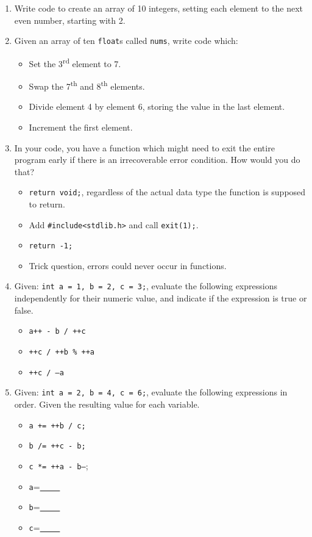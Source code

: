 \documentclass[letter,11pt]{article}
\begin{document}
\begin{enumerate}
    \item Write code to create an array of 10 integers, setting each element to the next even number, starting with 2.
    
    \item Given an array of ten \texttt{float}s called \texttt{nums}, write code which:
    \begin{itemize}
        \item Set the 3\textsuperscript{rd} element to 7.
        \item Swap the 7\textsuperscript{th} and 8\textsuperscript{th} elements.
        \item Divide element 4 by element 6, storing the value in the last element.
        \item Increment the first element.
    \end{itemize}
    
    \item In your code, you have a function which might need to exit the entire program early if there is an irrecoverable error condition. How would you do that?
    \begin{itemize}
        \item \texttt{return void;}, regardless of the actual data type the function is supposed to return.
        \item Add \texttt{\#include<stdlib.h>} and call \texttt{exit(1);}.
        \item \texttt{return -1;}
        \item Trick question, errors could never occur in functions.
    \end{itemize}
    
    \item Given: \texttt{int a = 1, b = 2, c = 3;}, evaluate the following expressions independently for their numeric value, and indicate if the expression is true or false.
    \begin{itemize}
        \item \texttt{a++ - b / ++c}
        \item \texttt{++c / ++b \% ++a}
        \item \texttt{++c / --a}
    \end{itemize}
    
    \item Given: \texttt{int a = 2, b = 4, c = 6;}, evaluate the following expressions in order. Given the resulting value for each variable.
    \begin{itemize}
        \item \texttt{a += ++b / c;}
        \item \texttt{b /= ++c - b;}
        \item \texttt{c *= ++a - b--};
        \item \texttt{a}=\underline{~~ ~~}
        \item \texttt{b}=\underline{~~ ~~}
        \item \texttt{c}=\underline{~~ ~~}
    \end{itemize}
    

\end{enumerate}
\end{document}
